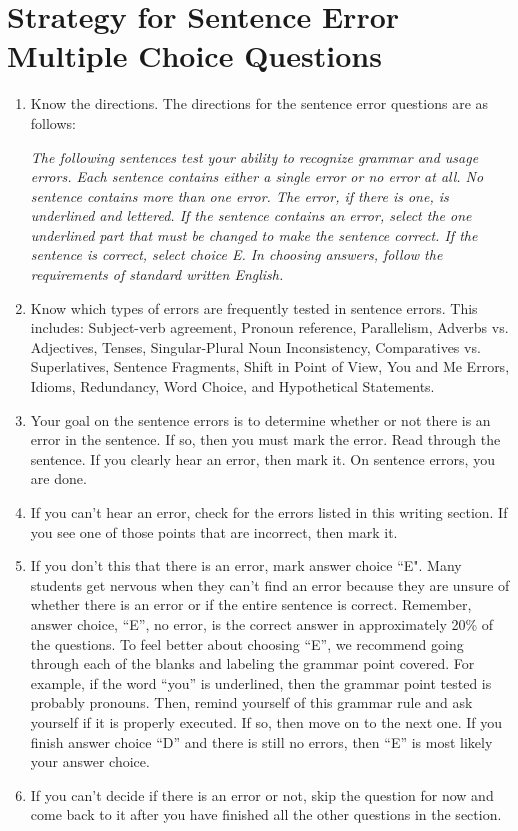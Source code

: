 \documentclass[12pt]{book}
\begin{document}
\section[Sentence Error]{Strategy for Sentence Error Multiple Choice Questions}
\begin{enumerate}
\item Know the directions. The directions for the sentence error questions are as follows:

\textit{The following sentences test your ability to recognize grammar and usage errors. Each sentence contains either a single error or no error at all. No sentence contains more than one error. The error, if there is one, is underlined and lettered. If the sentence contains an error, select the one underlined part that must be changed to make the sentence correct. If the sentence is correct, select choice E. In choosing answers, follow the requirements of standard written English.}

\vfill
\item Know which types of errors are frequently tested in sentence errors. This includes: Subject-verb agreement, Pronoun reference, Parallelism, Adverbs vs. Adjectives, Tenses, Singular-Plural Noun Inconsistency, Comparatives vs. Superlatives, Sentence Fragments, Shift in Point of View, You and Me Errors, Idioms, Redundancy, Word Choice, and Hypothetical Statements.
\vfill 
\item Your goal on the sentence errors is to determine whether or not there is an error in the sentence. If so, then you must mark the error. Read through the sentence. If you clearly hear an error, then mark it. On sentence errors, you are done.
\vfill
\item If you can't hear an error, check for the errors listed in this writing section. If you see one of those points that are incorrect, then mark it. 
\vfill
\item If you don't this that there is an error, mark answer choice ``E". Many students get nervous when they can't find an error because they are unsure of whether there is an error or if the entire sentence is correct. Remember, answer choice, “E”, no error, is the correct answer in approximately 20\% of the questions. To feel better about choosing “E”, we recommend going through each of the blanks and labeling the grammar point covered. For example, if the word “you” is underlined, then the grammar point tested is probably pronouns. Then, remind yourself of this grammar rule and ask yourself if it is properly executed. If so, then move on to the next one. If you finish answer choice “D” and there is still no errors, then “E” is most likely your answer choice.
\vfill
\item If you can't decide if there is an error or not, skip the question for now and come back to it after you have finished all the other questions in the section.
\vfill  
\end{enumerate}
\end{document}
